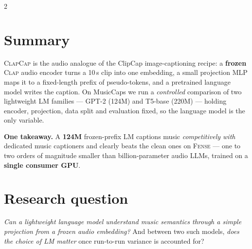 \documentclass[a0,portrait]{a0poster}
\newcommand{\sys}{\textsc{ClapCap}}
\newcommand{\clapenc}{\textsc{Clap}}
\newcommand{\fense}{\textsc{Fense}}
\begin{document}
\begin{multicols}{2}

\section*{Summary}
\Large
\sys{} is the audio analogue of the ClipCap image-captioning recipe: a
\textbf{frozen} \clapenc{} audio encoder turns a 10\,s clip into one embedding, a
small projection MLP maps it to a fixed-length prefix of pseudo-tokens, and a
pretrained language model writes the caption. On MusicCaps we run a
\emph{controlled} comparison of two lightweight LM families --- GPT-2 (124M) and
T5-base (220M) --- holding encoder, projection, data split and evaluation fixed,
so the language model is the only variable.

\begin{tcolorbox}[colback=cclight,colframe=ccnavy,boxrule=2pt,arc=8pt]
\Large\textbf{One takeaway.} A \textbf{124M} frozen-prefix LM captions music
\emph{competitively with} dedicated music captioners and clearly beats the
clean ones on \fense{} --- one to two orders of magnitude smaller than
billion-parameter audio LLMs, trained on a \textbf{single consumer GPU}.
\end{tcolorbox}

\section*{Research question}
\Large
\textit{Can a lightweight language model understand music semantics through a
simple projection from a frozen audio embedding?} And between two such models,
\emph{does the choice of LM matter} once run-to-run variance is accounted for?


\end{multicols}
\end{document}
